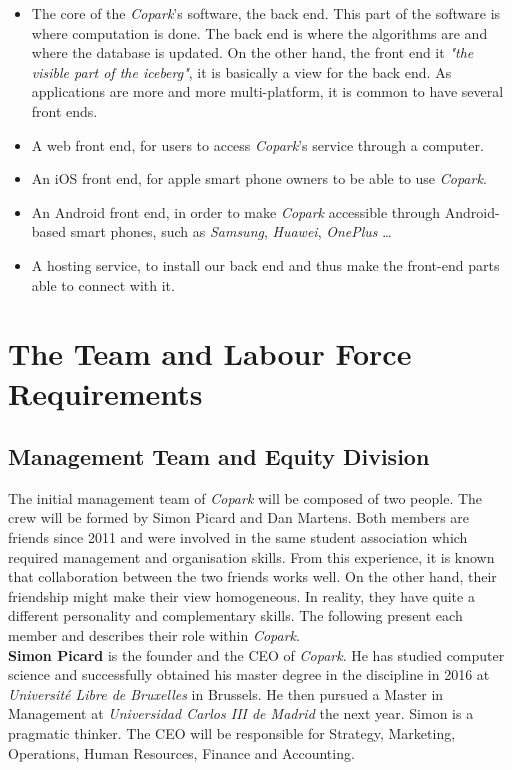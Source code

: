 \documentclass[12pt,a4paper,oneside]{book}
\newcommand{\bp}{\textit{Copark}}
\begin{document}
\begin{itemize}
\item The core of the \bp{}'s software, the back end. This part of the software is where computation is done. The back end is where the algorithms are and where the database is updated. On the other hand, the front end it \textit{"the visible part of the iceberg"}, it is basically a view for the back end. As applications are more and more multi-platform, it is common to have several front ends.

\item A web front end, for users to access \bp{}'s service through a computer.

\item An iOS front end, for apple smart phone owners to be able to use \bp{}.

\item An Android front end, in order to make \bp{} accessible through Android-based smart phones, such as \textit{Samsung}, \textit{Huawei}, \textit{OnePlus} …

\item A hosting service, to install our back end and thus make the front-end parts able to connect with it.
\end{itemize}

\section{The Team and Labour Force Requirements}
\subsection{Management Team and Equity Division}
The initial management team of \bp{} will be composed of two people. The crew will be formed by Simon Picard and Dan Martens. Both members are friends since 2011 and were involved in the same student association which required management and organisation skills. From this experience, it is known that collaboration between the two friends works well. On the other hand, their friendship might make their view homogeneous. In reality, they have quite a different personality and complementary skills. The following present each member and describes their role within \bp{}.\\

\textbf{Simon Picard} is the founder and the CEO of \bp{}. He has studied computer science and successfully obtained his master degree in the discipline in 2016 at \textit{Université Libre de Bruxelles} in Brussels. He then pursued a Master in Management at \textit{Universidad Carlos III de Madrid} the next year. Simon is a pragmatic thinker. The CEO will be responsible for Strategy, Marketing, Operations, Human Resources, Finance and Accounting.\\
\end{document}
